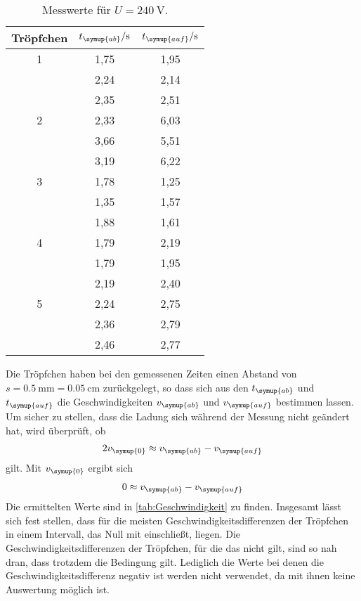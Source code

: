 \begin{table}
  \centering
  \caption{Messwerte für $U=\SI{240}{\volt}$.}
  \label{tab:t5}
  \begin{tabular}{c c c}
    \toprule
    Tröpfchen & $t_{\symup{ab}}/\unit{\second}$ & $t_{\symup{auf}}/\unit{\second}$ \\
    \midrule
    1 & 1,75 & 1,95 \\
      & 2,24 & 2,14 \\
      & 2,35 & 2,51 \\
    2 & 2,33 & 6,03 \\
      & 3,66 & 5,51 \\
      & 3,19 & 6,22 \\
    3 & 1,78 & 1,25 \\
      & 1,35 & 1,57 \\
      & 1,88 & 1,61 \\
    4 & 1,79 & 2,19 \\
      & 1,79 & 1,95 \\
      & 2,19 & 2,40 \\
    5 & 2,24 & 2,75 \\
      & 2,36 & 2,79 \\
      & 2,46 & 2,77 \\
    \bottomrule
  \end{tabular}
\end{table}
Die Tröpfchen haben bei den gemessenen Zeiten einen Abstand von $s=\SI{0,5}{\milli\meter} = \SI{0,05}{\centi\meter}$
zurückgelegt, so dass sich aus den $t_{\symup{ab}}$ und $t_{\symup{auf}}$ die Geschwindigkeiten $v_{\symup{ab}}$ und
$v_{\symup{auf}}$ bestimmen lassen. Um sicher zu stellen, dass die Ladung sich während der Messung nicht
geändert hat, wird überprüft, ob
\begin{align*}
  2v_{\symup{0}} \approx v_{\symup{ab}} - v_{\symup{auf}}
\end{align*}
gilt. Mit $v_{\symup{0}}$ ergibt sich
\begin{align*}
  0 \approx v_{\symup{ab}} - v_{\symup{auf}}
\end{align*}
Die ermittelten Werte sind in \autoref{tab:Geschwindigkeit} zu finden. Insgesamt lässt sich fest stellen, dass
für die meisten Geschwindigkeitsdifferenzen der Tröpfchen in einem Intervall, das Null mit einschließt, liegen.
Die Geschwindigkeitsdifferenzen der Tröpfchen, für die das nicht gilt, sind so nah dran, dass trotzdem die
Bedingung gilt. Lediglich die Werte bei denen die Geschwindigkeitsdifferenz negativ ist werden nicht verwendet,
da mit ihnen keine Auswertung möglich ist.
